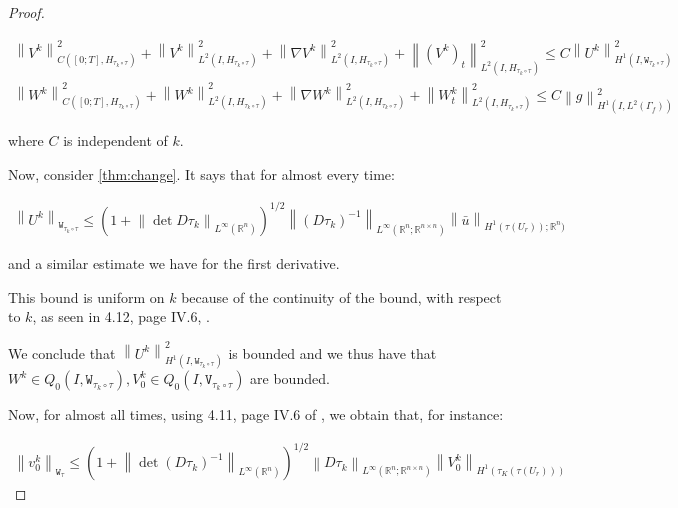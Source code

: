 \documentclass[english,a4paper,9pt,oneside]{scrbook}	%
\theoremstyle{break}
\newenvironment{mproof}[1][\proofname]{%
  \begin{proof}[#1]$ $\par\nobreak\ignorespaces
}{%
  \end{proof}
}
\renewcommand*{\proofname}{Proof}
\theoremstyle{remark}
\newcommand{\mR}{\mathbb{R}}
\newcommand{\norm}[1]{\left\lVert#1\right\rVert}
\newcommand{\te}{\theta}
\newcommand{\tw}[1]{\texttt{#1}}
\begin{document}
\begin{mproof}
\begin{align*}
\norm{V^k}^2_{C([0;T],H_{\tau_k\circ \tau})}+\norm{V^k}_{L^2(I,H_{\tau_k\circ \tau})}^2+ \norm{\nabla V^k}_{L^2(I,H_{\tau_k\circ \tau})}^2 + \norm{(V^k)_t}^2_{L^2(I,H_{\tau_k\circ \tau})}\leq C\norm{U^k}_{H^1(I,\tw{W}_{\tau_k\circ \tau})}^2\\
\norm{W^k}^2_{C([0;T],H_{\tau_k\circ \tau})}+\norm{W^k}_{L^2(I,H_{\tau_k\circ \tau})}^2+ \norm{\nabla W^k}_{L^2(I,H_{\tau_k\circ \tau})}^2 + \norm{W^k_t}^2_{L^2(I,H_{\tau_k\circ \tau})}\leq C\norm{g}_{H^1(I,L^2(\Gamma_f))}^2
\end{align*}


where $C$ is independent of $k$.


Now, consider \cref{thm:change}. It says that for almost every time:

\begin{align*}
\norm{U^k}_{\tw{W}_{\tau_k\circ \tau}}\leq \left ( 1+\norm{\det D\tau_k}_{L^\infty(\mR^n)}\right)^{1/2} \norm{(D\tau_k)^{-1}}_{L^\infty(\mR^n;\mR^{n\times n})}\norm{\bar{u}}_{H^1(\tau(U_r));\mR^n)}
\end{align*}

and a similar estimate we have for the first derivative. 



This bound is uniform on $k$ because of the continuity of the bound, with respect to $k$, as seen in 4.12, page IV.6, \cite{murat}.

We conclude that $\norm{U^k}_{H^1(I,\tw{W}_{\tau_k\circ \tau})}^2$ is bounded and we thus have that $W^k \in Q_0(I, \tw{W}_{\tau_k\circ \tau}), V_0^k \in Q_0(I,\tw{V}_{\tau_k\circ \tau})$ are bounded.

Now, for almost all times, using 4.11, page IV.6 of \cite{murat}, we obtain that, for instance:

\begin{align*}
\norm{v_0^k}_{\tw{W}_{ \tau}}\leq \left ( 1+\norm{\det (D\tau_k)^{-1}}_{L^\infty(\mR^n)}\right)^{1/2} \norm{D\tau_k}_{L^\infty(\mR^n;\mR^{n\times n})}\norm{V_0^k}_{H^1(\tau_K(\tau(U_r)))}
\end{align*}


\end{mproof}
\end{document}
